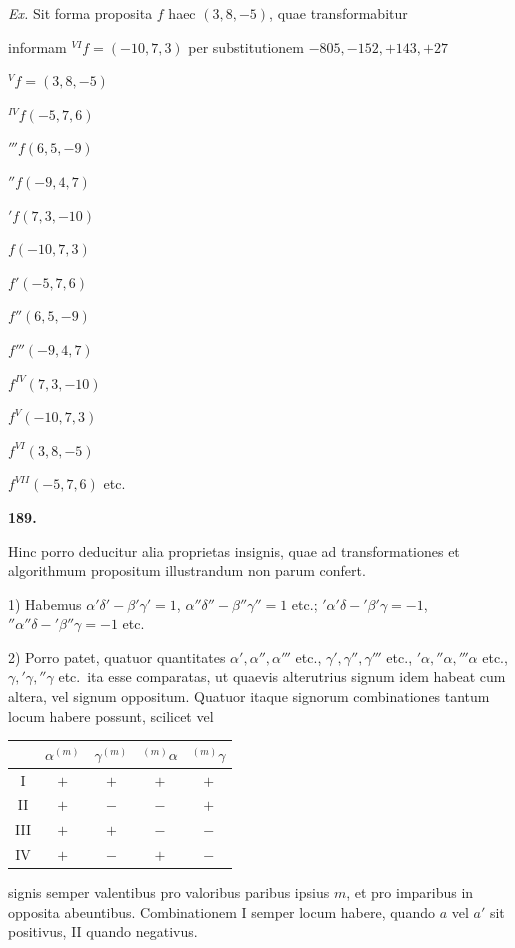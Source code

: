 \documentclass[12pt,a4paper]{article}
\theoremstyle{plain}
\theoremstyle{definition}
\theoremstyle{remark}
\begin{document}
\textit{Ex.} Sit forma proposita $f$ haec $(3,8,-5)$, quae transformabitur

informam $^{VI}f=(-10,7,3)$ per substitutionem $-805,-152,+143,+27$

$^{V}f=(3,8,-5)$

$^{IV}f(-5,7,6)$

$'''f(6,5,-9)$

$''f(-9,4,7)$

$'f(7,3,-10)$

$f(-10,7,3)$

$f'(-5,7,6)$

$f''(6,5,-9)$

$f'''(-9,4,7)$

$f^{IV}(7,3,-10)$

$f^{V}(-10,7,3)$

$f^{VI}(3,8,-5)$

$f^{VII}(-5,7,6)$ etc.

\textbf{189.}

Hinc porro deducitur alia proprietas insignis, quae ad transformationes et algorithmum propositum illustrandum non parum confert.

1) Habemus $\alpha'\delta'-\beta'\gamma'=1$, $\alpha''\delta''-\beta''\gamma''=1$ etc.; $'\alpha'\delta-'\beta'\gamma=-1$, $''\alpha''\delta-'\beta''\gamma=-1$ etc.

2) Porro patet, quatuor quantitates $\alpha',\alpha'',\alpha'''$ etc., $\gamma',\gamma'',\gamma'''$ etc., $'\alpha,''\alpha,'''\alpha$ etc., $\gamma,'\gamma,''\gamma$ etc.\ ita esse comparatas, ut quaevis alterutrius signum idem habeat cum altera, vel signum oppositum. Quatuor itaque signorum combinationes tantum locum habere possunt, scilicet vel
\begin{center}
\begin{tabular}{c|cccc}
& $\alpha^{(m)}$ & $\gamma^{(m)}$ & $^{(m)}\alpha$ & $^{(m)}\gamma$ \\
\hline
I & $+$ & $+$ & $+$ & $+$ \\
II & $+$ & $-$ & $-$ & $+$ \\
III & $+$ & $+$ & $-$ & $-$ \\
IV & $+$ & $-$ & $+$ & $-$ \\
\end{tabular}
\end{center}
signis semper valentibus pro valoribus paribus ipsius $m$, et pro imparibus in opposita abeuntibus. Combinationem I semper locum habere, quando $a$ vel $a'$ sit positivus, II quando negativus.
\end{document}

